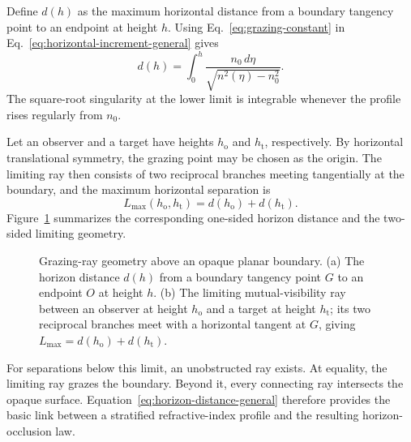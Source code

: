Define $d(h)$ as the maximum horizontal distance from a boundary tangency
point to an endpoint at height $h$. Using Eq.~\eqref{eq:grazing-constant} in
Eq.~\eqref{eq:horizontal-increment-general} gives
\begin{equation}
    d(h)
    =
    \int_0^h
    \frac{n_0\,d\eta}
         {\sqrt{n^2(\eta)-n_0^2}}.
    \label{eq:horizon-distance-general}
\end{equation}
The square-root singularity at the lower limit is integrable whenever the
profile rises regularly from $n_0$.

Let an observer and a target have heights $h_{\mathrm{o}}$ and
$h_{\mathrm{t}}$, respectively. By horizontal translational symmetry, the
grazing point may be chosen as the origin. The limiting ray then consists
of two reciprocal branches meeting tangentially at the boundary, and the
maximum horizontal separation is
\begin{equation}
    L_{\max}(h_{\mathrm{o}},h_{\mathrm{t}})
    =
    d(h_{\mathrm{o}})+d(h_{\mathrm{t}}).
    \label{eq:maximum-separation-general}
\end{equation}
Figure~\ref{fig:grazing-geometry} summarizes the corresponding one-sided
horizon distance and the two-sided limiting geometry.
\begin{figure}[tb]
    \centering
    \resizebox{\textwidth}{!}{}
    \caption{Grazing-ray geometry above an opaque planar boundary.
    (a) The horizon distance $d(h)$ from a boundary tangency point $G$ to an
    endpoint $O$ at height $h$. (b) The limiting mutual-visibility ray between
    an observer at height $h_{\mathrm{o}}$ and a target at height
    $h_{\mathrm{t}}$; its two reciprocal branches meet with a horizontal
    tangent at $G$, giving
    $L_{\max}=d(h_{\mathrm{o}})+d(h_{\mathrm{t}})$.}
    \label{fig:grazing-geometry}
\end{figure}
For separations below this limit, an unobstructed ray exists. At equality,
the limiting ray grazes the boundary. Beyond it, every connecting ray
intersects the opaque surface.
Equation~\eqref{eq:horizon-distance-general} therefore provides the basic
link between a stratified refractive-index profile and the resulting
horizon-occlusion law.
